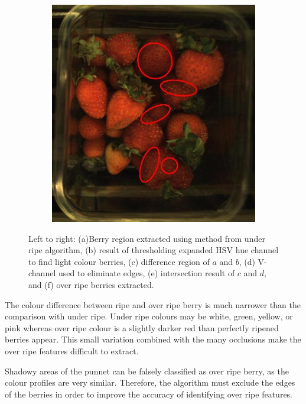\documentclass[fleqn,twoside,12pt]{report}
\begin{document}
\begin{figure}[ht]
\begin{subfigure}{.30\textwidth}
		\caption{}
		\label{fig:over_light_diff}
	\end{subfigure}%
	\begin{subfigure}{.30\textwidth}
		\centering
		\includegraphics[width=.9\linewidth]{over_result.jpg}
		\caption{}
		\label{fig:over_result}
	\end{subfigure}%
	
	\caption{Left to right: (a)Berry region extracted using method from under ripe algorithm, (b) result of thresholding expanded HSV hue channel to find light colour berries, (c) difference region of $a$ and $b$, (d) V-channel used to eliminate edges,  (e) intersection result of $c$ and $d$, and (f) over ripe berries extracted.}
	\label{fig:over ripe_process}
\end{figure} 

The colour difference between ripe and over ripe berry is much narrower than the comparison with under ripe. Under ripe colours may be white, green, yellow, or pink whereas over ripe colour is a slightly darker red than perfectly ripened berries appear. This small variation combined with the many occlusions make the over ripe features difficult to extract.

Shadowy areas of the punnet can be falsely classified as over ripe berry, as the colour profiles are very similar. Therefore, the algorithm must exclude the edges of the berries in order to improve the accuracy of identifying over ripe features. 
\end{document}

